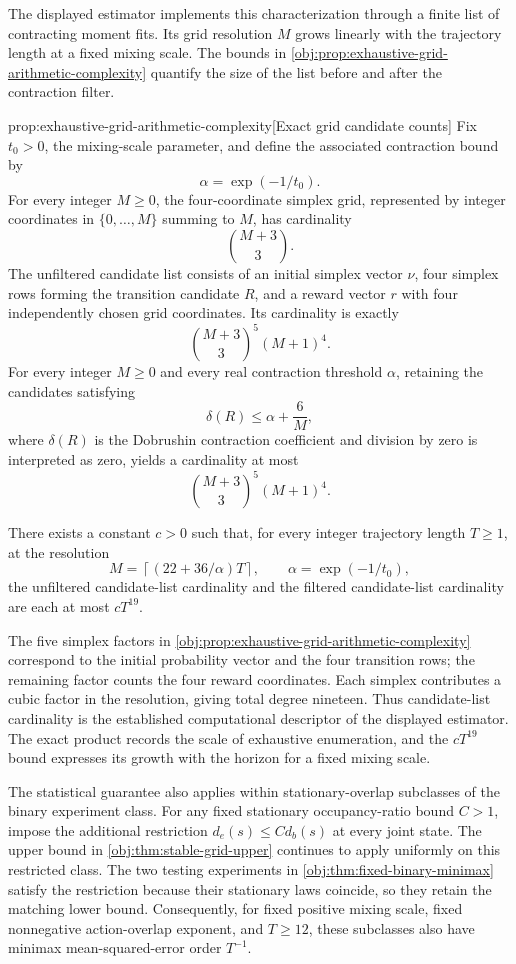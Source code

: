 \documentclass[11pt]{article}
\begin{document}
The displayed estimator implements this characterization through a finite list of contracting moment fits. Its grid resolution \(M\) grows linearly with the trajectory length at a fixed mixing scale. The bounds in \cref{obj:prop:exhaustive-grid-arithmetic-complexity} quantify the size of the list before and after the contraction filter.

\begin{propositionv}{prop:exhaustive-grid-arithmetic-complexity}[Exact grid candidate counts]
Fix \(t_0>0\), the mixing-scale parameter, and define the associated contraction bound by
\[
\alpha=\exp(-1/t_0).
\]
For every integer \(M\ge0\), the four-coordinate simplex grid, represented by integer coordinates in \(\{0,\ldots,M\}\) summing to \(M\), has cardinality
\[
\binom{M+3}{3}.
\]
The unfiltered candidate list consists of an initial simplex vector \(\nu\), four simplex rows forming the transition candidate \(R\), and a reward vector \(r\) with four independently chosen grid coordinates. Its cardinality is exactly
\[
\binom{M+3}{3}^{5}(M+1)^4.
\]
For every integer \(M\ge0\) and every real contraction threshold \(\alpha\), retaining the candidates satisfying
\[
\delta(R)\le \alpha+\frac{6}{M},
\]
where \(\delta(R)\) is the Dobrushin contraction coefficient and division by zero is interpreted as zero, yields a cardinality at most
\[
\binom{M+3}{3}^{5}(M+1)^4.
\]

There exists a constant \(c>0\) such that, for every integer trajectory length \(T\ge1\), at the resolution
\[
M=\left\lceil(22+36/\alpha)T\right\rceil,
\qquad \alpha=\exp(-1/t_0),
\]
the unfiltered candidate-list cardinality and the filtered candidate-list cardinality are each at most \(cT^{19}\).
\end{propositionv}

The five simplex factors in \cref{obj:prop:exhaustive-grid-arithmetic-complexity} correspond to the initial probability vector and the four transition rows; the remaining factor counts the four reward coordinates. Each simplex contributes a cubic factor in the resolution, giving total degree nineteen. Thus candidate-list cardinality is the established computational descriptor of the displayed estimator. The exact product records the scale of exhaustive enumeration, and the \(cT^{19}\) bound expresses its growth with the horizon for a fixed mixing scale.

The statistical guarantee also applies within stationary-overlap subclasses of the binary experiment class. For any fixed stationary occupancy-ratio bound \(C>1\), impose the additional restriction \(d_e(s)\leq C d_b(s)\) at every joint state. The upper bound in \cref{obj:thm:stable-grid-upper} continues to apply uniformly on this restricted class. The two testing experiments in \cref{obj:thm:fixed-binary-minimax} satisfy the restriction because their stationary laws coincide, so they retain the matching lower bound. Consequently, for fixed positive mixing scale, fixed nonnegative action-overlap exponent, and \(T\geq12\), these subclasses also have minimax mean-squared-error order \(T^{-1}\).
\end{document}
